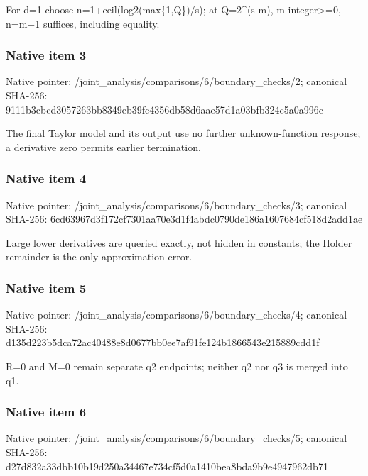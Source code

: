 \documentclass[10pt,a4paper]{article}
\begin{document}
\begingroup\raggedright\sloppy For d=\allowbreak{}1 choose n=\allowbreak{}1+ceil(log2(max\{1,\allowbreak{}Q\})/\allowbreak{}s);\allowbreak{} at Q=\allowbreak{}2\textasciicircum{}(s m),\allowbreak{} m integer>=\allowbreak{}0,\allowbreak{} n=\allowbreak{}m+1 suffices,\allowbreak{} including equality.\par\endgroup

\subsubsection{Native item 3}
Native pointer: /joint\_\allowbreak{}analysis/comparisons/6/boundary\_\allowbreak{}checks/2; canonical SHA-256: 9111b3cbcd3057263bb8349eb39fc4356db58d6aae57d1a03bfb324c5a0a996c

\begingroup\raggedright\sloppy The final Taylor model and its output use no further unknown-function response;\allowbreak{} a derivative zero permits earlier termination.\par\endgroup

\subsubsection{Native item 4}
Native pointer: /joint\_\allowbreak{}analysis/comparisons/6/boundary\_\allowbreak{}checks/3; canonical SHA-256: 6cd63967d3f172cf7301aa70e3d1f4abdc0790de186a1607684cf518d2add1ae

\begingroup\raggedright\sloppy Large lower derivatives are queried exactly,\allowbreak{} not hidden in constants;\allowbreak{} the Holder remainder is the only approximation error.\par\endgroup

\subsubsection{Native item 5}
Native pointer: /joint\_\allowbreak{}analysis/comparisons/6/boundary\_\allowbreak{}checks/4; canonical SHA-256: d135d223b5dca72ac40488e8d0677bb0ee7af91fe124b1866543e215889cdd1f

\begingroup\raggedright\sloppy R=\allowbreak{}0 and M=\allowbreak{}0 remain separate q2 endpoints;\allowbreak{} neither q2 nor q3 is merged into q1.\par\endgroup

\subsubsection{Native item 6}
Native pointer: /joint\_\allowbreak{}analysis/comparisons/6/boundary\_\allowbreak{}checks/5; canonical SHA-256: d27d832a33dbb10b19d250a34467e734cf5d0a1410bea8bda9b9e4947962db71
\end{document}
